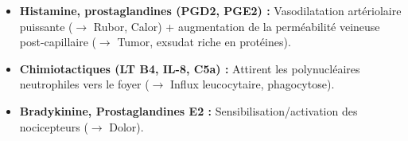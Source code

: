 \documentclass[11pt]{article}
\begin{document}
\begin{corrige}
\begin{enumerate}
    \begin{itemize}
        \item \textbf{Histamine, prostaglandines (PGD2, PGE2) :} Vasodilatation artériolaire puissante ($\rightarrow$ Rubor, Calor) + augmentation de la perméabilité veineuse post-capillaire ($\rightarrow$ Tumor, exsudat riche en protéines).
        \item \textbf{Chimiotactiques (LT B4, IL-8, C5a) :} Attirent les polynucléaires neutrophiles vers le foyer ($\rightarrow$ Influx leucocytaire, phagocytose).
        \item \textbf{Bradykinine, Prostaglandines E2 :} Sensibilisation/activation des nocicepteurs ($\rightarrow$ Dolor).
    \end{itemize}
\end{enumerate}
\end{corrige}

\end{document}

